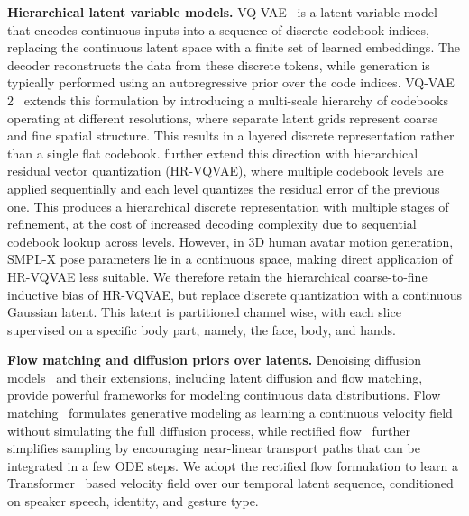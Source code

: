 \noindent \textbf{Hierarchical latent variable models.}
VQ-VAE~\cite{vqvae} is a latent variable model that encodes continuous inputs into a sequence of discrete codebook indices, replacing the continuous latent space with a finite set of learned embeddings.
The decoder reconstructs the data from these discrete tokens, while generation is typically performed using an autoregressive prior over the code indices.
VQ-VAE 2~\cite{vqvae2} extends this formulation by introducing a multi-scale hierarchy of codebooks operating at different resolutions, where separate latent grids represent coarse and fine spatial structure.
This results in a layered discrete representation rather than a single flat codebook.
\citet{adiban2022} further extend this direction with hierarchical residual vector quantization (HR-VQVAE), where multiple codebook levels are applied sequentially and each level quantizes the residual error of the previous one.
This produces a hierarchical discrete representation with multiple stages of refinement, at the cost of increased decoding complexity due to sequential codebook lookup across levels.
However, in 3D human avatar motion generation, SMPL-X pose parameters lie in a continuous space, making direct application of HR-VQVAE less suitable.
We therefore retain the hierarchical coarse-to-fine inductive bias of HR-VQVAE, but replace discrete quantization with a continuous Gaussian latent.
This latent is partitioned channel wise, with each slice supervised on a specific body part, namely, the face, body, and hands.

\noindent \textbf{Flow matching and diffusion priors over latents.}
Denoising diffusion models~\cite{ddpm} and their extensions, including latent diffusion and flow matching, provide powerful frameworks for modeling continuous data distributions.
Flow matching~\cite{lipman2023flow} formulates generative modeling as learning a continuous velocity field without simulating the full diffusion process, while rectified flow~\cite{rectifiedflow} further simplifies sampling by encouraging near-linear transport paths that can be integrated in a few ODE steps.
We adopt the rectified flow formulation to learn a Transformer~\cite{transformer} based velocity field over our temporal latent sequence, conditioned on speaker speech, identity, and gesture type.

